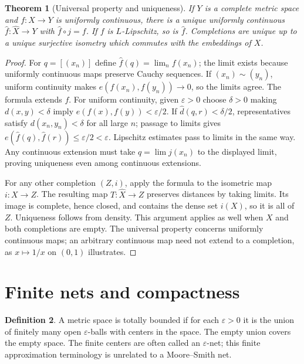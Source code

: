 \documentclass[11pt,oneside,openany]{book}
\newtheorem{theorem}{Theorem}[chapter]
\theoremstyle{definition}
\newtheorem{definition}[theorem]{Definition}
\theoremstyle{remark}
\newcommand{\eps}{\varepsilon}
\begin{document}
\begin{theorem}[Universal property and uniqueness]\label{d10:09:completion-universal}
If $Y$ is a complete metric space and $f:X\to Y$ is uniformly continuous, there is a unique uniformly continuous $\widehat f:\widehat X\to Y$ with $\widehat f\circ j=f$. If $f$ is $L$-Lipschitz, so is $\widehat f$. Completions are unique up to a unique surjective isometry which commutes with the embeddings of $X$.
\end{theorem}
\begin{proof}
For $q=[(x_n)]$ define $\widehat f(q)=\lim_n f(x_n)$; the limit exists because uniformly continuous maps preserve Cauchy sequences. If $(x_n)\sim(y_n)$, uniform continuity makes $e(f(x_n),f(y_n))\to0$, so the limits agree. The formula extends $f$. For uniform continuity, given $\eps>0$ choose $\delta>0$ making $d(x,y)<\delta$ imply $e(f(x),f(y))<\eps/2$. If $\widehat d(q,r)<\delta/2$, representatives satisfy $d(x_n,y_n)<\delta$ for all large $n$; passage to limits gives $e(\widehat f(q),\widehat f(r))\leq\eps/2<\eps$. Lipschitz estimates pass to limits in the same way. Any continuous extension must take $q=\lim j(x_n)$ to the displayed limit, proving uniqueness even among continuous extensions.

For any other completion $(Z,i)$, apply the formula to the isometric map $i:X\to Z$. The resulting map $T:\widehat X\to Z$ preserves distances by taking limits. Its image is complete, hence closed, and contains the dense set $i(X)$, so it is all of $Z$. Uniqueness follows from density. This argument applies as well when $X$ and both completions are empty. The universal property concerns uniformly continuous maps; an arbitrary continuous map need not extend to a completion, as $x\mapsto1/x$ on $(0,1)$ illustrates.
\end{proof}

\section{Finite nets and compactness}
\begin{definition}\label{d10:09:total-bounded}
A metric space is totally bounded if for each $\eps>0$ it is the union of finitely many open $\eps$-balls with centers in the space. The empty union covers the empty space. The finite centers are often called an $\eps$-net; this finite approximation terminology is unrelated to a Moore--Smith net.
\end{definition}
\end{document}
